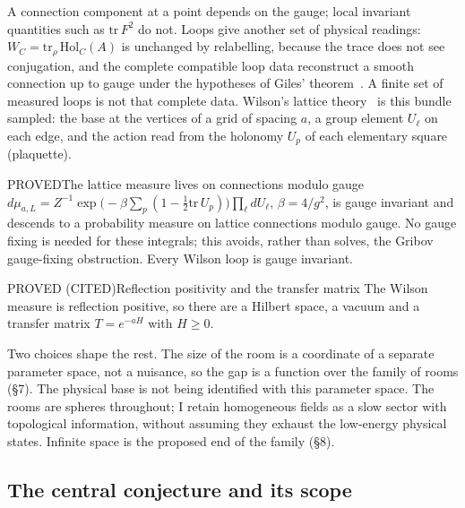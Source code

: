 A connection component at a point depends on the gauge; local invariant quantities such as $\mathrm{tr}\,F^2$ do not.
Loops give another set of physical readings:
$W_C=\mathrm{tr}_\rho\,\mathrm{Hol}_C(A)$ is unchanged by relabelling, because the trace does not see conjugation, and
the complete compatible loop data reconstruct a smooth connection up to gauge under the hypotheses of
Giles' theorem~\cite{Giles81}. A finite set of measured loops is not that complete data. Wilson's lattice theory~\cite{Wilson74} is this
bundle sampled: the base at the vertices of a grid of spacing $a$, a group element $U_\ell$ on each edge, and the action
read from the holonomy $U_p$ of each elementary square (plaquette).

\begin{claim}{PROVED}{The lattice measure lives on connections modulo gauge}\label{b:wilson}
$d\mu_{a,L}=Z^{-1}\exp\bigl(-\beta\sum_p(1-\tfrac12\mathrm{tr}\,U_p)\bigr)\prod_\ell dU_\ell$, $\beta=4/g^2$, is gauge
invariant and descends to a probability measure on lattice connections modulo gauge. No gauge fixing is needed for
these integrals; this avoids, rather than solves, the Gribov gauge-fixing obstruction. Every Wilson loop is gauge invariant.
\end{claim}

\begin{claim}{PROVED (CITED)}{Reflection positivity and the transfer matrix}\label{b:rp}
The Wilson measure is reflection positive, so there are a Hilbert space, a vacuum and a transfer matrix $T=e^{-aH}$ with
$H\ge0$.
\end{claim}

Two choices shape the rest. The size of the room is a coordinate of a separate parameter space, not a nuisance, so the gap is a function
over the family of rooms (\S7). The physical base is not being identified with this parameter space.
The rooms are spheres throughout; I retain homogeneous fields as a slow sector with topological information,
without assuming they exhaust the low-energy physical states. Infinite space is the proposed end of the family (\S8).
\subsection*{The central conjecture and its scope}


